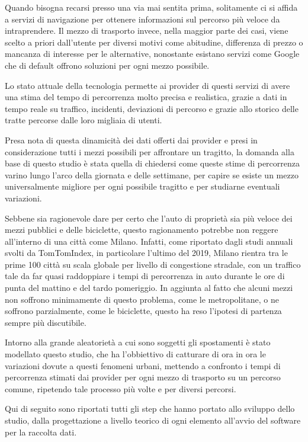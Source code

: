 Quando bisogna recarsi presso una via mai sentita prima, solitamente ci si affida a servizi di navigazione per ottenere informazioni sul percorso più veloce da intraprendere.
Il mezzo di trasporto invece, nella maggior parte dei casi, viene scelto a priori dall'utente per diversi motivi come abitudine, differenza di prezzo o mancanza di interesse per le alternative, nonostante esistano servizi come Google che di default offrono soluzioni per ogni mezzo possibile.

Lo stato attuale della tecnologia permette ai provider di questi servizi di avere una stima del tempo di percorrenza molto precisa e realistica, grazie a dati in tempo reale su traffico, incidenti, deviazioni di percorso e grazie allo storico delle tratte percorse dalle loro migliaia di utenti.

Presa nota di questa dinamicità dei dati offerti dai provider e presi in considerazione tutti i mezzi possibili per affrontare un tragitto, la domanda alla base di questo studio è stata quella di chiedersi come queste stime di percorrenza varino lungo l'arco della giornata e delle settimane, per capire se esiste un mezzo universalmente migliore per ogni possibile tragitto e per studiarne eventuali variazioni.

Sebbene sia ragionevole dare per certo che l'auto di proprietà sia più veloce dei mezzi pubblici e delle biciclette, questo ragionamento potrebbe non reggere all'interno di una città come Milano. Infatti, come riportato dagli studi annuali svolti da TomTomIndex, in particolare l'ultimo del 2019\cite{tomtomindexmilan}, Milano rientra tra le prime 100 città su scala globale per livello di congestione stradale, con un traffico tale da far quasi raddoppiare i tempi di percorrenza in auto durante le ore di punta del mattino e del tardo pomeriggio. In aggiunta al fatto che alcuni mezzi non soffrono minimamente di questo problema, come le metropolitane, o ne soffrono parzialmente, come le biciclette, questo ha reso l'ipotesi di partenza sempre più discutibile.

Intorno alla grande aleatorietà a cui sono soggetti gli spostamenti è stato modellato questo studio, che ha l'obbiettivo di catturare di ora in ora le variazioni dovute a questi fenomeni urbani, mettendo a confronto i tempi di percorrenza stimati dai provider per ogni mezzo di trasporto su un percorso comune, ripetendo tale processo più volte e per diversi percorsi.

Qui di seguito sono riportati tutti gli step che hanno portato allo sviluppo dello studio, dalla progettazione a livello teorico di ogni elemento all'avvio del software per la raccolta dati.

